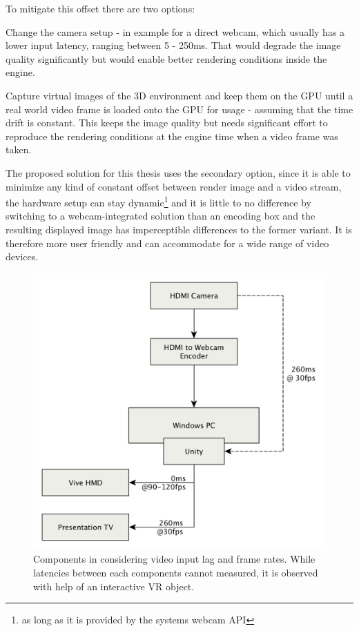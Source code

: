 To mitigate this offset there are two options:

\begin{my_list}
	\item Change the camera setup - in example for a direct webcam, which 
	usually has a lower input latency, ranging between 5 - 250ms. That would 
	degrade the image quality significantly but would enable better rendering 
	conditions inside the engine.
	\item Capture virtual images of the 3D environment and keep them on the GPU 
	until a real world video frame is loaded onto the GPU for usage - assuming 
	that the time drift is constant. This keeps the image quality but needs 
	significant effort to reproduce the rendering conditions at the engine time 
	when a video frame was taken.
\end{my_list}

The proposed solution for this thesis uses the secondary option, since it is 
able to minimize any kind of constant offset between render image and a video 
stream, the hardware setup can stay dynamic\footnote{as long as it is provided 
by the systems webcam API} and it is little to no difference by switching to a 
webcam-integrated solution than an encoding box and the resulting displayed 
image has imperceptible differences to the former variant. It is therefore more 
user friendly and can accommodate for a wide range of video devices.

\begin{figure}[htb]
	\includegraphics[width=\textwidth]{gfx/FPS-Timing-Components.png}
	\caption{Components in considering video input lag and frame rates. While 
	latencies between each components cannot measured, it is observed with help 
	of an interactive VR object.}
	\label{fig:offsets:components}
\end{figure}

